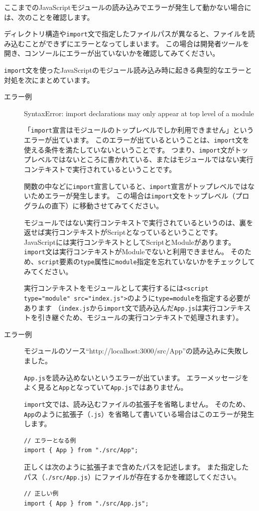 ここまでのJavaScriptモジュールの読み込みでエラーが発生して動かない場合には、次のことを確認します。

ディレクトリ構造や\texttt{import}文で指定したファイルパスが異なると、ファイルを読み込むことができずにエラーとなってしまいます。
この場合は開発者ツールを開き、コンソールにエラーが出ていないかを確認してみてください。

\texttt{import}文を使ったJavaScriptのモジュール読み込み時に起きる典型的なエラーと対処を次にまとめています。

\begin{description}
\item[エラー例] SyntaxError: import declarations may only appear at top level of a module

「\texttt{import}宣言はモジュールのトップレベルでしか利用できません」というエラーが出ています。
このエラーが出ているということは、\texttt{import}文を使える条件を満たしていないということです。
つまり、\texttt{import}文がトップレベルではないところに書かれている、またはモジュールではない実行コンテキストで実行されているということです。

関数の中などに\texttt{import}宣言していると、\texttt{import}宣言がトップレベルではないためエラーが発生します。
この場合は\texttt{import}文をトップレベル（プログラムの直下）に移動させてみてください。

モジュールではない実行コンテキストで実行されているというのは、裏を返せば実行コンテキストがScriptとなっているということです。
JavaScriptには実行コンテキストとしてScriptとModuleがあります。
\texttt{import}文は実行コンテキストがModuleでないと利用できません。
そのため、\texttt{script}要素の\texttt{type}属性に\texttt{module}指定を忘れていないかをチェックしてみてください。

実行コンテキストをモジュールとして実行するには\texttt{<script type="module" src="index.js">}のように\texttt{type=module}を指定する必要があります
（\texttt{index.js}から\texttt{import}文で読み込んだ\texttt{App.js}は実行コンテキストを引き継ぐため、モジュールの実行コンテキストで処理されます）。

\item[エラー例] モジュールのソース``http://localhost:3000/src/App''の読み込みに失敗しました。

\texttt{App.js}を読み込めないというエラーが出ています。
エラーメッセージをよく見ると\texttt{App}となっていて\texttt{App.js}ではありません。

\texttt{import}文では、読み込むファイルの拡張子を省略しません。
そのため、\texttt{App}のように拡張子（\texttt{.js}）を省略して書いている場合はこのエラーが発生します。

\begin{lstlisting}
// エラーとなる例
import { App } from "./src/App";
\end{lstlisting}

正しくは次のように拡張子まで含めたパスを記述します。
また指定したパス（\texttt{./src/App.js}）にファイルが存在するかを確認してください。

\begin{lstlisting}
// 正しい例
import { App } from "./src/App.js";
\end{lstlisting}
\end{description}

